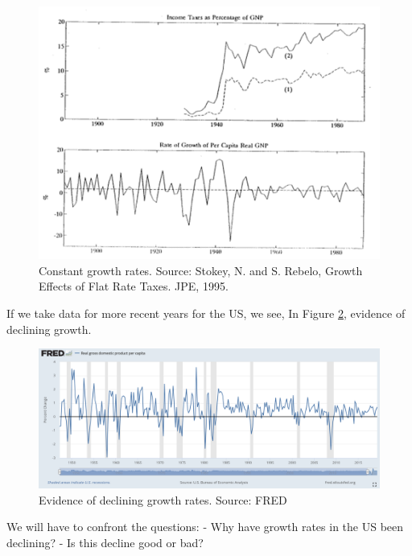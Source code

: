 \documentclass[
]{book}
\begin{document}
\begin{figure}

{\centering \includegraphics[width=1\linewidth]{img/growth/growth12} 

}

\caption{Constant growth rates. Source: Stokey, N. and S. Rebelo, Growth Effects of Flat Rate Taxes. JPE, 1995.}\label{fig:growth12}
\end{figure}

If we take data for more recent years for the US, we see, In Figure \ref{fig:growth13}, evidence of declining growth.

\begin{figure}

{\centering \includegraphics[width=1\linewidth]{img/growth/growth13} 

}

\caption{Evidence of declining growth rates. Source: FRED}\label{fig:growth13}
\end{figure}

We will have to confront the questions:
- Why have growth rates in the US been declining?
- Is this decline good or bad?
\end{document}
